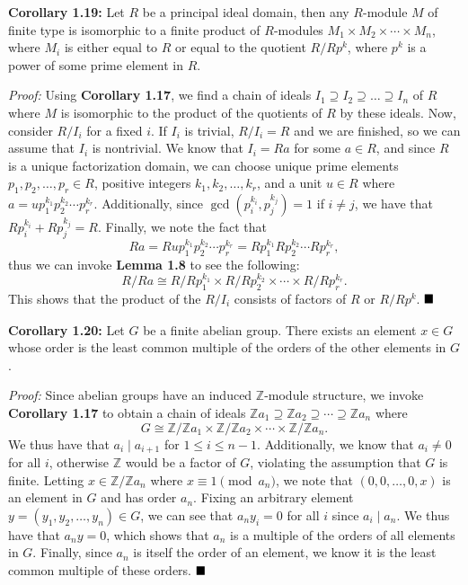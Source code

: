 \documentclass[12pt]{article}
\newcommand{\Z}{\ensuremath{\mathbb{Z}}}
\newcommand{\proof}{\textit{Proof: }}
\newcommand{\done}{\ensuremath{\strut\hfill\blacksquare}}
\begin{document}
\textbf{Corollary 1.19:}
Let \( R \) be a principal ideal domain, then any \( R \)-module \( M \) of
finite type is isomorphic to a finite product of \( R \)-modules
\( M_1 \times M_2 \times \cdots \times M_n \), where \( M_i \) is either equal
to \( R \) or equal to the quotient \( R/Rp^k \), where \( p^k \) is a power of
some prime element in \( R \).

\proof
Using \textbf{Corollary 1.17}, we find a chain of ideals
\( I_1 \supseteq I_2 \supseteq \dots \supseteq I_n \) of \( R \) where
\( M \) is isomorphic to the product of the quotients of \( R \) by these
ideals.
Now, consider \( R/I_i \) for a fixed \( i \).
If \( I_i \) is trivial, \( R/I_i = R \) and we are finished, so we can assume
that \( I_i \) is nontrivial.
We know that \( I_i = Ra \) for some \( a \in R \), and since \( R \) is a
unique factorization domain, we can choose unique prime elements
\( p_1, p_2, \dots, p_r \in R \), positive integers \( k_1, k_2, \dots, k_r \),
and a unit \( u \in R \) where \( a = up_1^{k_1}p_2^{k_2} \cdots p_r^{k_r} \).
Additionally, since \( \gcd(p_i^{k_i}, p_j^{k_j}) = 1 \) if \( i \ne j \), we
have that \( Rp_i^{k_i} + Rp_j^{k_j} = R \).
Finally, we note the fact that
\[
	Ra
	= Rup_1^{k_1}p_2^{k_2} \cdots p_r^{k_r}
	= Rp_1^{k_1}Rp_2^{k_2} \cdots Rp_r^{k_r},
\]
thus we can invoke \textbf{Lemma 1.8} to see the following:
\[
	R/Ra
	\cong R/Rp_1^{k_1} \times R/Rp_2^{k_2} \times \cdots \times R/Rp_r^{k_r}.
\]
This shows that the product of the \( R/I_i \) consists of factors of \( R \)
or \( R/Rp^k \).
\done

\textbf{Corollary 1.20:}
Let \( G \) be a finite abelian group.
There exists an element \( x \in G \) whose order is the least common multiple
of the orders of the other elements in \( G \).

\proof
Since abelian groups have an induced \( \Z \)-module structure, we invoke
\textbf{Corollary 1.17} to obtain a chain of ideals
\( \Z a_1 \supseteq \Z a_2 \supseteq \cdots \supseteq \Z a_n \) where
\[
	G
	\cong \Z/\Z a_1 \times \Z/\Z a_2 \times \cdots \times \Z/\Z a_n.
\]
We thus have that \( a_i \mid a_{i + 1} \) for \( 1 \leq i \leq n - 1 \).
Additionally, we know that \( a_i \ne 0 \) for all \( i \), otherwise \( \Z \)
would be a factor of \( G \), violating the assumption that \( G \) is finite.
Letting \( x \in \Z/\Z a_n \) where \( x \equiv 1 \pmod{a_n} \), we note that
\( (0, 0, \dots, 0, x) \) is an element in \( G \) and has order \( a_n \).
Fixing an arbitrary element \( y = (y_1, y_2, \dots, y_n) \in G \), we can see
that \( a_ny_i = 0 \) for all \( i \) since \( a_i \mid a_n \).
We thus have that \( a_ny = 0 \), which shows that \( a_n \) is a multiple
of the orders of all elements in \( G \).
Finally, since \( a_n \) is itself the order of an element, we know it is
the least common multiple of these orders.
\done
\end{document}
